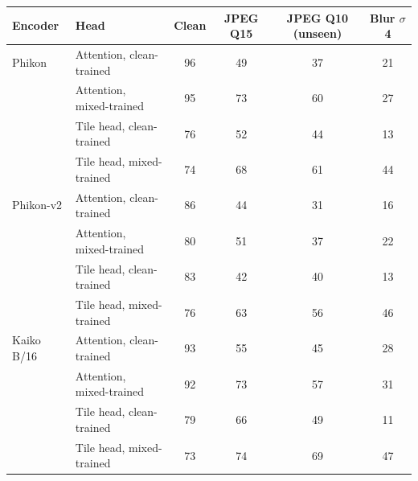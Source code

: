 \begin{tabular}{@{}llcccc@{}}
\toprule
Encoder & Head & Clean & JPEG Q15 & JPEG Q10 (unseen) & Blur $\sigma$ 4\\
\midrule
Phikon & Attention, clean-trained & 96 & 49 & 37 & 21\\
 & Attention, mixed-trained & 95 & 73 & 60 & 27\\
 & Tile head, clean-trained & 76 & 52 & 44 & 13\\
 & Tile head, mixed-trained & 74 & 68 & 61 & 44\\
\addlinespace
Phikon-v2 & Attention, clean-trained & 86 & 44 & 31 & 16\\
 & Attention, mixed-trained & 80 & 51 & 37 & 22\\
 & Tile head, clean-trained & 83 & 42 & 40 & 13\\
 & Tile head, mixed-trained & 76 & 63 & 56 & 46\\
\addlinespace
Kaiko B/16 & Attention, clean-trained & 93 & 55 & 45 & 28\\
 & Attention, mixed-trained & 92 & 73 & 57 & 31\\
 & Tile head, clean-trained & 79 & 66 & 49 & 11\\
 & Tile head, mixed-trained & 73 & 74 & 69 & 47\\
\bottomrule
\end{tabular}